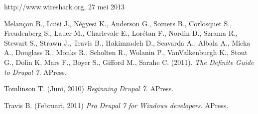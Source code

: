 \begin{thebibliography}{99}
 http://www.wireshark.org, 27 mei 2013

 Melançon B., Luisi J., Négyesi K., Anderson G., Somers B., Corlosquet S., Freudenberg S., Lauer M., Charlevale E., Lorétan F., Nordin D., Szrama R., Stewart S., Strawn J., Travis B., Hakimzadeh D., Scavarda A., Albala A., Micka A., Douglass R., Monks R., Scholten R., Wolanin P., VanValkenburgh K., Stout G., Dolin K, Mars F., Boyer S., Gifford M., Sarahe C. (2011). {\em The Definite Guide to Drupal 7.} APress.

 Tomlinson T. (Juni, 2010) {\em Beginning Drupal 7.} APress.

 Travis B. (Februari, 2011) {\em Pro Drupal 7 for Windows developers.} APress.

\end{thebibliography}

